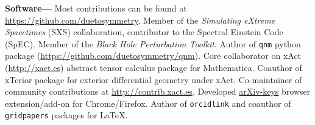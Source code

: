\documentclass[margin,line]{res}
\begin{document}
\begin{resume}

{\bf Software---}%
Most contributions can be found at \url{https://github.com/duetosymmetry}.
Member of the {\it Simulating eXtreme Spacetimes} (SXS) collaboration,
contributor to the Spectral Einstein Code (SpEC).
Member of the {\it Black Hole Perturbation Toolkit}. Author of
{\tt qnm} python package (\url{https://github.com/duetosymmetry/qnm}).
Core collaborator on {\sc xAct} (\url{http://xact.es}) abstract
tensor calculus package for {\sc  Mathematica}. Coauthor
of {\sc xTerior} package for exterior differential geometry under
{\sc xAct}. Co-maintainer of community contributions at
\url{http://contrib.xact.es}. Developed
\href{https://chrome.google.com/webstore/detail/arxiv-keys/fkjjdlbhliopfhgddlpoggpmpgjfaojd}{arXiv-keys}
browser extension/add-on for Chrome/Firefox.
Author of {\tt orcidlink} and coauthor of {\tt gridpapers} packages for \LaTeX.


\ifx\nopubs\undefined

\else
%
\fi



\newpage{}


\end{resume}
\end{document}
